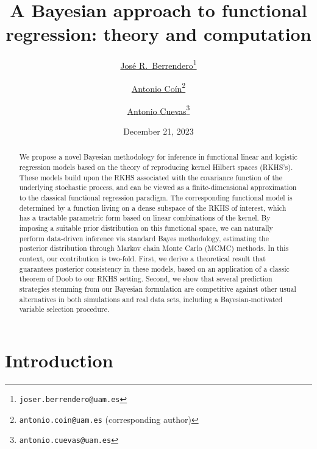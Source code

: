 \documentclass{article}
\title{A Bayesian approach to functional regression: theory and computation}
\date{December 21, 2023}
\author[1,2]{%
	\href{https://orcid.org/0000-0003-0728-7748}{\usebox{\orcid}\hspace{1mm}José R.~Berrendero\thanks{\texttt{\href{mailto:joser.berrendero@uam.es}{joser.berrendero@uam.es}}}}%
}
\author[1]{%
	\href{https://orcid.org/0009-0004-7554-9193}{\usebox{\orcid}\hspace{1mm}Antonio Coín\thanks{\texttt{\href{mailto:antonio.coin@uam.es}{antonio.coin@uam.es}} (corresponding author)}}%
}
\author[1,2]{%
	\href{https://orcid.org/0000-0002-7993-0096}{\usebox{\orcid}\hspace{1mm}Antonio Cuevas\thanks{\texttt{\href{mailto:antonio.cuevas@uam.es}{antonio.cuevas@uam.es}}}}%
}
\affil[1]{Departamento de Matemáticas, Universidad Autónoma de Madrid (UAM), Madrid, Spain}
\affil[2]{Instituto de Ciencias Matemáticas ICMAT (CSIC-UAM-UC3M-UCM), Madrid, Spain}
\numberwithin{equation}{section}
\theoremstyle{plain}
\begin{document}
  \maketitle

  \begin{abstract}
    We propose a novel Bayesian methodology for inference in functional linear and logistic regression models based on the theory of reproducing kernel Hilbert spaces (RKHS's). These models build upon the RKHS associated with the covariance function of the underlying stochastic process, and can be viewed as a finite-dimensional approximation to the classical functional regression paradigm. The corresponding functional model is determined by a function living on a dense subspace of the RKHS of interest, which has a tractable parametric form based on linear combinations of the kernel. By imposing a suitable prior distribution on this functional space, we can naturally perform data-driven inference via standard Bayes methodology, estimating the posterior distribution through Markov chain Monte Carlo (MCMC) methods. In this context, our contribution is two-fold. First, we derive a theoretical result that guarantees posterior consistency in these models, based on an application of a classic theorem of Doob to our RKHS setting. Second, we show that several prediction strategies stemming from our Bayesian formulation are competitive against other usual alternatives in both simulations and real data sets, including a Bayesian-motivated variable selection procedure.
  \end{abstract}




\section{Introduction}\label{sec:intro}
\end{document}
